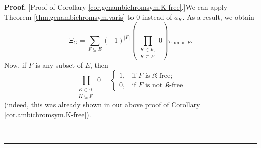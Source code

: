 \documentclass[numbers=enddot,12pt,final,onecolumn,notitlepage]{scrartcl}%
\theoremstyle{definition}
\newenvironment{proof}[1][Proof]{\noindent\textbf{#1.} }{\ \rule{0.5em}{0.5em}}
\newenvironment{verlong}{}{}
\let\sumnonlimits\sum
\let\prodnonlimits\prod
\renewcommand{\sum}{\sumnonlimits\limits}
\renewcommand{\prod}{\prodnonlimits\limits}
\begin{document}
\begin{verlong}
\begin{proof}
[Proof of Corollary \ref{cor.genambichromsym.K-free}.]We can apply Theorem
\ref{thm.genambichromsym.varis} to $0$ instead of $a_{K}$. As a result, we
obtain%
\begin{equation}
\Xi_{G}=\sum_{F\subseteq E}\left(  -1\right)  ^{\left\vert F\right\vert
}\left(  \prod_{\substack{K\in\mathfrak{K};\\K\subseteq F}}0\right)
\pi_{\operatorname*{union}F}. \label{pf.cor.genambichromsym.K-free.0}%
\end{equation}
Now, if $F$ is any subset of $E$, then%
\begin{equation}
\prod_{\substack{K\in\mathfrak{K};\\K\subseteq F}}0=%
\begin{cases}
1, & \text{if }F\text{ is }\mathfrak{K}\text{-free;}\\
0, & \text{if }F\text{ is not }\mathfrak{K}\text{-free}%
\end{cases}
\label{pf.cor.genambichromsym.K-free.1}%
\end{equation}
(indeed, this was already shown in our above proof of Corollary
\ref{cor.ambichromsym.K-free}).


\end{proof}
\end{verlong}
\end{document}
